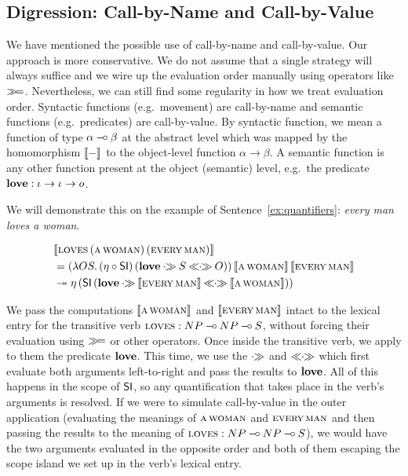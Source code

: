 \subsection{Digression: Call-by-Name and Call-by-Value}
\label{ssec:cbn-and-cbv}

We have mentioned the possible use of call-by-name and call-by-value. Our
approach is more conservative. We do not assume that a single strategy will
always suffice and we wire up the evaluation order manually using operators
like $\mathbin{\gg\!=}$. Nevertheless, we can still find some regularity in how we
treat evaluation order. Syntactic functions (e.g.\ movement) are
call-by-name and semantic functions (e.g.\ predicates) are
call-by-value. By syntactic function, we mean a function of type
$\alpha \mathbin{{-}\mkern-3.5mu{\circ}} \beta$ at the abstract level which was mapped by the
homomorphism $\llbracket - \rrbracket$ to the object-level function $\alpha \to \beta$. A
semantic function is any other function present at the object (semantic)
level, e.g.\ the predicate $\textbf{love} : \iota \to \iota \to o$.

We will demonstrate this on the example of Sentence~\ref{ex:quantifiers}:
\emph{every man loves a woman}.

\begin{align*}
& \sem{\app{\abs{loves}}{(\ap{\abs{a}}{\abs{woman}})}{(\ap{\abs{every}}{\abs{man}})}} \\
&= \app{(\lam{O S}{\ap{(\eta \circ \SI)}{(\obj{love} \apr S \aplr O)}})}{\sem{\ap{\abs{a}}{\abs{woman}}}}{\sem{\ap{\abs{every}}{\abs{man}}}} \\
&\tto \etaE{(\ap{\SI}{(\obj{love} \apr \sem{\ap{\abs{every}}{\abs{man}}} \aplr \sem{\ap{\abs{a}}{\abs{woman}}})})}
\end{align*}

We pass the computations $\llbracket \textsc{a}\,\textsc{woman} \rrbracket$ and
$\llbracket \textsc{every}\,\textsc{man} \rrbracket$ intact to the lexical entry for the
transitive verb $\textsc{loves} : NP \mathbin{{-}\mkern-3.5mu{\circ}} NP \mathbin{{-}\mkern-3.5mu{\circ}} S$, without forcing their
evaluation using $\mathbin{\gg\!=}$ or other operators. Once inside the transitive
verb, we apply to them the predicate $\textbf{love}$. This time, we use the
$\mathbin{\cdot\!\!\gg}$ and $\mathbin{\ll\!\!\cdot\!\!\gg}$ which first evaluate both arguments left-to-right and
pass the results to $\textbf{love}$. All of this happens in the scope of
$\textsf{SI}$, so any quantification that takes place in the verb's arguments is
resolved. If we were to simulate call-by-value in the outer application
(evaluating the meanings of $\textsc{a}\,\textsc{woman}$ and
$\textsc{every}\,\textsc{man}$ and then passing the results to the meaning
of $\textsc{loves} : NP \mathbin{{-}\mkern-3.5mu{\circ}} NP \mathbin{{-}\mkern-3.5mu{\circ}} S$), we would have the two arguments
evaluated in the opposite order and both of them escaping the scope island
we set up in the verb's lexical entry.

